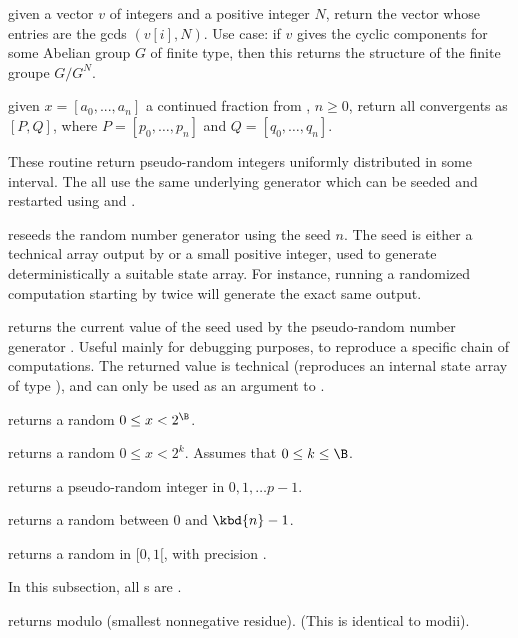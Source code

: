  given a vector $v$ of integers and a
positive integer $N$, return the vector whose entries are the gcds
$(v[i],N)$. Use case: if $v$ gives the cyclic components for some Abelian
group $G$ of finite type, then this returns the structure of the finite
groupe $G/G^N$.


 given $x = [a_0, ..., a_n]$ a
continued fraction from , $n\geq0$, return all
convergents as $[P,Q]$, where $P = [p_0,\dots,p_n]$ and $Q =
[q_0,\dots,q_n]$.

These routine return pseudo-random integers uniformly distributed in some
interval. The all use the same underlying generator which can be seeded and
restarted using  and .

 reseeds the random number generator using the
seed $n$. The seed is either a technical array output by 
or a small positive integer, used to generate deterministically a suitable
state array. For instance, running a randomized computation starting by
 twice will generate the exact same output.

 returns the current value of the seed used by the
pseudo-random number generator . Useful mainly for debugging
purposes, to reproduce a specific chain of computations. The returned value
is technical (reproduces an internal state array of type ),
and can only be used as an argument to .

 returns a random $0 \leq x < 2^\B$.

 returns a random $0 \leq x < 2^k$. Assumes
that $0 \leq k \leq \B$.

 returns a pseudo-random integer
in $0, 1, \dots p-1$.

 returns a random  between $0$ and $\kbd{n}
- 1$.

 returns a random  in $[0,1[$, with
precision .

 In this subsection, all s are
.

 returns  modulo  (smallest
nonnegative residue). (This is identical to modii).

